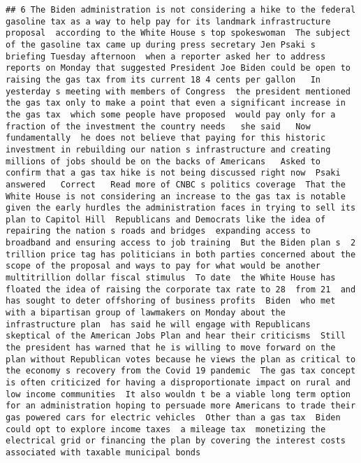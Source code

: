 \documentclass[
]{article}
\begin{document}
\begin{verbatim}
## 6 The Biden administration is not considering a hike to the federal gasoline tax as a way to help pay for its landmark infrastructure proposal  according to the White House s top spokeswoman  The subject of the gasoline tax came up during press secretary Jen Psaki s briefing Tuesday afternoon  when a reporter asked her to address reports on Monday that suggested President Joe Biden could be open to raising the gas tax from its current 18 4 cents per gallon   In yesterday s meeting with members of Congress  the president mentioned the gas tax only to make a point that even a significant increase in the gas tax  which some people have proposed  would pay only for a fraction of the investment the country needs   she said   Now  fundamentally  he does not believe that paying for this historic investment in rebuilding our nation s infrastructure and creating millions of jobs should be on the backs of Americans   Asked to confirm that a gas tax hike is not being discussed right now  Psaki answered   Correct   Read more of CNBC s politics coverage  That the White House is not considering an increase to the gas tax is notable given the early hurdles the administration faces in trying to sell its plan to Capitol Hill  Republicans and Democrats like the idea of repairing the nation s roads and bridges  expanding access to broadband and ensuring access to job training  But the Biden plan s  2 trillion price tag has politicians in both parties concerned about the scope of the proposal and ways to pay for what would be another multitrillion dollar fiscal stimulus  To date  the White House has floated the idea of raising the corporate tax rate to 28  from 21  and has sought to deter offshoring of business profits  Biden  who met with a bipartisan group of lawmakers on Monday about the infrastructure plan  has said he will engage with Republicans skeptical of the American Jobs Plan and hear their criticisms  Still  the president has warned that he is willing to move forward on the plan without Republican votes because he views the plan as critical to the economy s recovery from the Covid 19 pandemic  The gas tax concept is often criticized for having a disproportionate impact on rural and low income communities  It also wouldn t be a viable long term option for an administration hoping to persuade more Americans to trade their gas powered cars for electric vehicles  Other than a gas tax  Biden could opt to explore income taxes  a mileage tax  monetizing the electrical grid or financing the plan by covering the interest costs associated with taxable municipal bonds
\end{verbatim}
\end{document}
